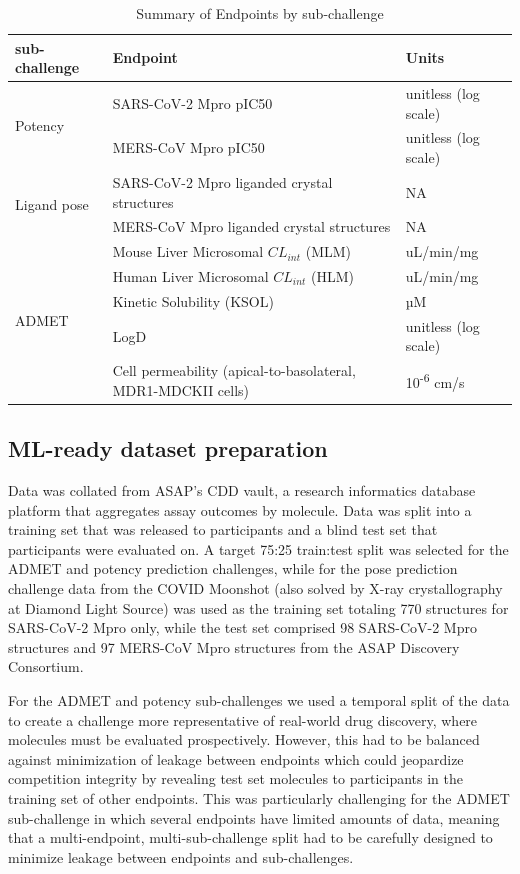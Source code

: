 \documentclass[journal=jcim,manuscript=article]{achemso}
\begin{document}
\begin{table}[ht]
\centering
\caption{Summary of Endpoints by sub-challenge}
\begin{tabular}{|l|l|l|}
\hline
\textbf{sub-challenge} & \textbf{Endpoint} & \textbf{Units} \\
\hline
\multirow{2}{*}{Potency} 
& SARS-CoV-2 Mpro pIC50 & unitless (log scale) \\
& MERS-CoV Mpro pIC50    & unitless (log scale) \\
\hline
\multirow{2}{*}{Ligand pose} 
& SARS-CoV-2 Mpro liganded crystal structures & NA \\
& MERS-CoV Mpro liganded crystal structures   & NA \\
\hline
\multirow{5}{*}{ADMET} 
& Mouse Liver Microsomal $CL_{int}$ (MLM)  & uL/min/mg \\
& Human Liver Microsomal $CL_{int}$ (HLM)  & uL/min/mg \\
& Kinetic Solubility (KSOL)               & µM \\
& LogD                                    & unitless (log scale) \\
& Cell permeability (apical-to-basolateral, MDR1-MDCKII cells) & 10\textsuperscript{-6} cm/s \\
\hline
\end{tabular}
\end{table}

\subsection{ML-ready dataset preparation}

Data was collated from ASAP’s CDD vault, a research informatics database platform that aggregates assay outcomes by molecule. Data was split into a training set that was released to participants and a blind test set that participants were evaluated on. A target 75:25 train:test split was selected for the ADMET and potency prediction challenges, while for the pose prediction challenge data from the COVID Moonshot\cite{boby_2023} (also solved by X-ray crystallography at Diamond Light Source) was used as the training set totaling 770 structures for SARS-CoV-2 Mpro only, while the test set comprised 98 SARS-CoV-2 Mpro structures and 97 MERS-CoV Mpro structures from the ASAP Discovery Consortium.  

For the ADMET and potency sub-challenges we used a temporal split of the data to create a challenge more representative of real-world drug discovery, where molecules must be evaluated prospectively\cite{sheridan_time-split_2013}. However, this had to be balanced against minimization of leakage between endpoints which could jeopardize competition integrity by revealing test set molecules to participants in the training set of other endpoints. This was particularly challenging for the ADMET sub-challenge in which several endpoints have limited amounts of data, meaning that a multi-endpoint, multi-sub-challenge split had to be carefully designed to minimize leakage between endpoints and sub-challenges. 
\end{document}
